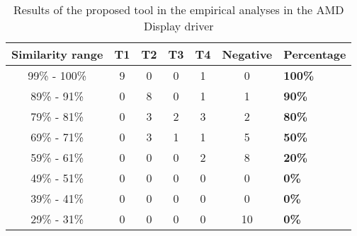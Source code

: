 \begin{table}
\begin{tabular}{ | c | c | c | c | c | c | m{8em} | }

\hline

\textbf{Similarity range} & \textbf{T1} & \textbf{T2} & \textbf{T3} & \textbf{T4}
& \textbf{Negative} & \textbf{Percentage} \\ \hline 
99\% - 100\% & 9 & 0 & 0 & 1 & 0 & \textbf{100\%} \\ \hline
89\% - 91\% & 0 & 8 & 0 & 1 & 1 & \textbf{90\%} \\ \hline
79\% - 81\% & 0 & 3 & 2 & 3 & 2 & \textbf{80\%} \\ \hline
69\% - 71\% & 0 & 3 & 1 & 1 & 5 & \textbf{50\%} \\ \hline
59\% - 61\% & 0 & 0 & 0 & 2 & 8 & \textbf{20\%} \\ \hline
49\% - 51\% & 0 & 0 & 0 & 0 & 0 & \textbf{0\%} \\ \hline
39\% - 41\% & 0 & 0 & 0 & 0 & 0 & \textbf{0\%} \\ \hline
29\% - 31\% & 0 & 0 & 0 & 0 & 10 & \textbf{0\%} \\ \hline

\hline

\end{tabular}
\label{tab:emp}
\caption{Results of the proposed tool in the empirical analyses in the AMD Display driver}

\end{table}
